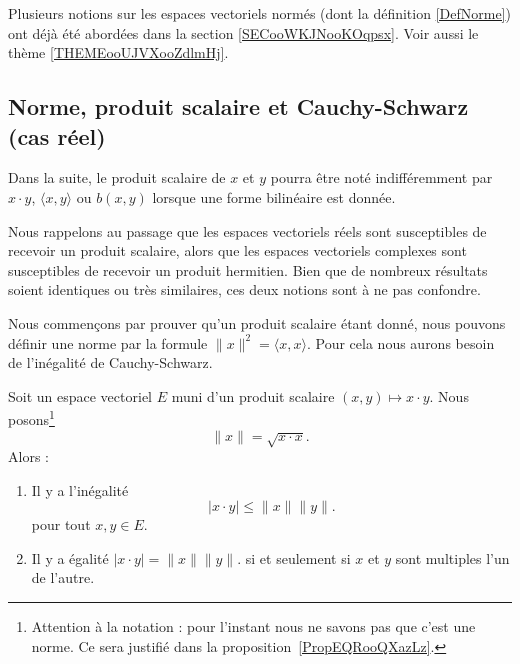 
Plusieurs notions sur les espaces vectoriels normés (dont la définition \ref{DefNorme}) ont déjà été abordées dans la section \ref{SECooWKJNooKOqpsx}. Voir aussi le thème \ref{THEMEooUJVXooZdlmHj}.

\subsection{Norme, produit scalaire et Cauchy-Schwarz (cas réel)}

Dans la suite, le produit scalaire de \( x\) et \( y\) pourra être noté indifféremment par \( x\cdot y\), \( \langle x, y\rangle \) ou \( b(x,y)\) lorsque une forme bilinéaire est donnée.

Nous rappelons au passage que les espaces vectoriels réels sont susceptibles de recevoir un produit scalaire, alors que les espaces vectoriels complexes sont susceptibles de recevoir un produit hermitien. Bien que de nombreux résultats soient identiques ou très similaires, ces deux notions sont à ne pas confondre.

Nous commençons par prouver qu'un produit scalaire étant donné, nous pouvons définir une norme par la formule \( \| x \|^2=\langle x, x\rangle \). Pour cela nous aurons besoin de l'inégalité de Cauchy-Schwarz.

\begin{theorem}      \label{ThoAYfEHG}
    Soit un espace vectoriel \( E\) muni d'un produit scalaire \( (x,y)\mapsto x\cdot y\). Nous posons\footnote{Attention à la notation : pour l'instant nous ne savons pas que c'est une norme. Ce sera justifié dans la proposition~\ref{PropEQRooQXazLz}.}
    \begin{equation}
        \| x \|=\sqrt{ x\cdot x }.
    \end{equation}
    Alors :
    \begin{enumerate}
        \item
            Il y a l'inégalité
    \begin{equation}        \label{EQooZDSHooWPcryG}
        | x\cdot y |\leq \| x \|\| y \|.
    \end{equation}
    pour tout \( x,y\in E\).
\item
    Il y a égalité \( | x\cdot y | = \| x \|\| y \|.\) si et seulement si \( x\) et \( y\) sont multiples l'un de l'autre.
    \end{enumerate}
\end{theorem}

